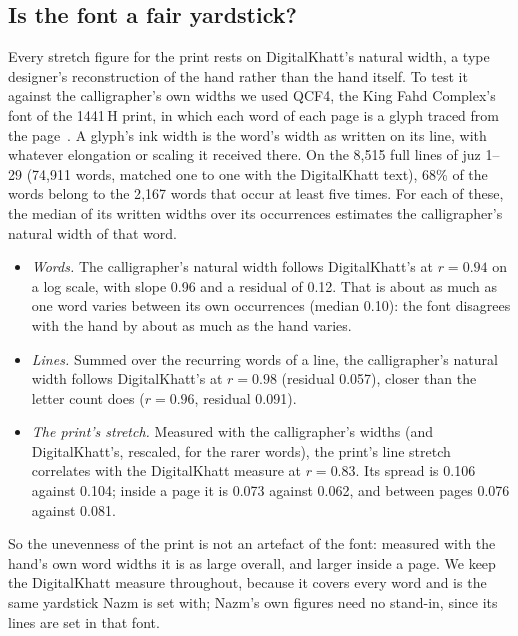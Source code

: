 \documentclass[sigconf,nonacm]{acmart}
\begin{document}
\subsection{Is the font a fair yardstick?}\label{sec:yardstick}
Every stretch figure for the print rests on DigitalKhatt's natural width, a type designer's reconstruction of the hand rather than the hand itself. To test it against the calligrapher's own widths we used QCF4, the King Fahd Complex's font of the 1441\,H print, in which each word of each page is a glyph traced from the page~\cite{qcf4}. A glyph's ink width is the word's width as written on its line, with whatever elongation or scaling it received there. On the 8{,}515 full lines of juz 1--29 (74{,}911 words, matched one to one with the DigitalKhatt text), 68\% of the words belong to the 2{,}167 words that occur at least five times. For each of these, the median of its written widths over its occurrences estimates the calligrapher's natural width of that word.
\begin{itemize}
  \item \emph{Words.} The calligrapher's natural width follows DigitalKhatt's at $r=0.94$ on a log scale, with slope 0.96 and a residual of 0.12. That is about as much as one word varies between its own occurrences (median 0.10): the font disagrees with the hand by about as much as the hand varies.
  \item \emph{Lines.} Summed over the recurring words of a line, the calligrapher's natural width follows DigitalKhatt's at $r=0.98$ (residual 0.057), closer than the letter count does ($r=0.96$, residual 0.091).
  \item \emph{The print's stretch.} Measured with the calligrapher's widths (and DigitalKhatt's, rescaled, for the rarer words), the print's line stretch correlates with the DigitalKhatt measure at $r=0.83$. Its spread is 0.106 against 0.104; inside a page it is 0.073 against 0.062, and between pages 0.076 against 0.081.
\end{itemize}
So the unevenness of the print is not an artefact of the font: measured with the hand's own word widths it is as large overall, and larger inside a page. We keep the DigitalKhatt measure throughout, because it covers every word and is the same yardstick Nazm is set with; Nazm's own figures need no stand-in, since its lines are set in that font.
\end{document}
